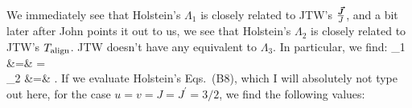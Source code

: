 
We immediately see that Holstein's $\Lambda_1$ is closely related to JTW's $\frac{\bm{\vec{J}}}{J}$, and a bit later after John points it out to us, we see that Holstein's $\Lambda_2$ is closely related to JTW's $T_{\mathrm{align}}$.  JTW doesn't have any equivalent to $\Lambda_3$.  In particular, we find:
\bea
\Lambda_1 \hatj &=& \LambdaOne \hatj \;\; = \;\;   \\
\Lambda_2 &=& \Talign {}.
\eea
If we evaluate Holstein's Eqs.~(B8), which I will absolutely not type out here, for the case $u=v=J=J^\prime=3/2$, we find the following values:
\unskip  %
